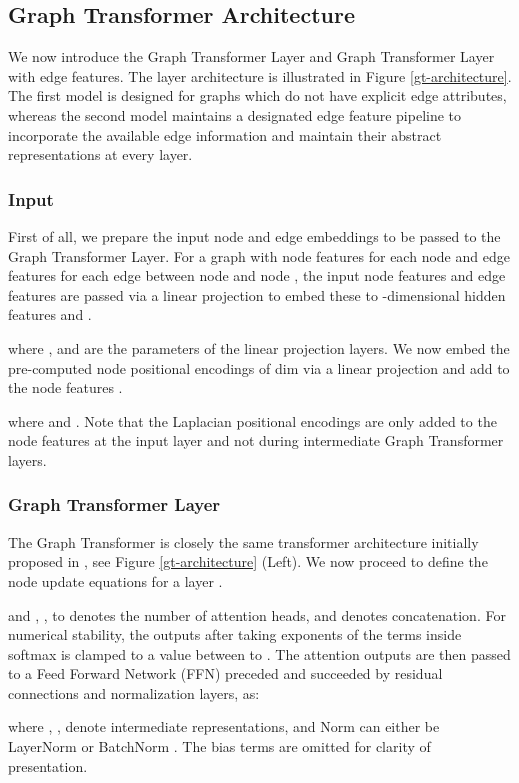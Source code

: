 \documentclass[letterpaper]{article} \usepackage{aaai21}  \usepackage{times}  \usepackage{helvet} \usepackage{courier}  \usepackage[hyphens]{url}  \usepackage{graphicx} \urlstyle{rm} \def\UrlFont{\rm}  \usepackage{natbib}  \usepackage{caption} \usepackage{xcolor}
\begin{document}
\subsection{Graph Transformer Architecture}
We now introduce the Graph Transformer Layer and Graph Transformer Layer with edge features. The layer architecture is illustrated in Figure \ref{gt-architecture}. The first model is designed for graphs which do not have explicit edge attributes, whereas the second model maintains a designated edge feature pipeline to incorporate the available edge information and maintain their abstract representations at every layer.

\subsubsection{Input} First of all, we prepare the input node and edge embeddings to be passed to the Graph Transformer Layer. For a graph  with node features  for each node  and edge features  for each edge between node  and node , the input node features  and edge features  are passed via a linear projection to embed these to -dimensional hidden features  and .

where ,  and  
are the parameters of the linear projection layers.
We now embed the pre-computed node positional encodings of dim  via a linear projection and add to the node features .

where  and . Note that the Laplacian positional encodings are only added to the node features at the input layer and not during intermediate Graph Transformer layers.

\subsubsection{Graph Transformer Layer} The Graph Transformer is closely the same transformer architecture initially proposed in \cite{vaswani2017attention}, see Figure \ref{gt-architecture} (Left).
We now proceed to define the node update equations for a layer . 



and , ,  to  denotes the number of attention heads, and  denotes concatenation. 
For numerical stability, the outputs after taking exponents of the terms inside softmax is clamped to a value between  to .
The attention outputs  are then passed to a Feed Forward Network (FFN) preceded and succeeded by residual connections and normalization layers, as:


where , ,  denote intermediate representations, and  Norm can either be LayerNorm\cite{ba2016layer} or BatchNorm \cite{ioffe2015batch}. The bias terms are omitted for clarity of presentation.
\end{document}
